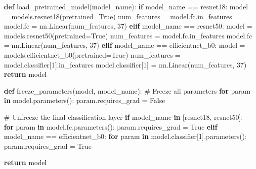 \documentclass[
]{article}
\newenvironment{Shaded}{\begin{snugshade}}{\end{snugshade}}
\newcommand{\CommentTok}[1]{\textcolor[rgb]{0.37,0.37,0.37}{#1}}
\newcommand{\ControlFlowTok}[1]{\textcolor[rgb]{0.00,0.23,0.31}{\textbf{#1}}}
\newcommand{\DecValTok}[1]{\textcolor[rgb]{0.68,0.00,0.00}{#1}}
\newcommand{\KeywordTok}[1]{\textcolor[rgb]{0.00,0.23,0.31}{\textbf{#1}}}
\newcommand{\NormalTok}[1]{\textcolor[rgb]{0.00,0.23,0.31}{#1}}
\newcommand{\OperatorTok}[1]{\textcolor[rgb]{0.37,0.37,0.37}{#1}}
\newcommand{\StringTok}[1]{\textcolor[rgb]{0.13,0.47,0.30}{#1}}
\newcommand{\VariableTok}[1]{\textcolor[rgb]{0.07,0.07,0.07}{#1}}
\begin{document}
\begin{Shaded}
\begin{Highlighting}[]
\KeywordTok{def}\NormalTok{ load\_pretrained\_model(model\_name):}
    \ControlFlowTok{if}\NormalTok{ model\_name }\OperatorTok{==} \StringTok{\textquotesingle{}resnet18\textquotesingle{}}\NormalTok{:}
\NormalTok{        model }\OperatorTok{=}\NormalTok{ models.resnet18(pretrained}\OperatorTok{=}\VariableTok{True}\NormalTok{)}
\NormalTok{        num\_features }\OperatorTok{=}\NormalTok{ model.fc.in\_features}
\NormalTok{        model.fc }\OperatorTok{=}\NormalTok{ nn.Linear(num\_features, }\DecValTok{37}\NormalTok{)}
    \ControlFlowTok{elif}\NormalTok{ model\_name }\OperatorTok{==} \StringTok{\textquotesingle{}resnet50\textquotesingle{}}\NormalTok{:}
\NormalTok{        model }\OperatorTok{=}\NormalTok{ models.resnet50(pretrained}\OperatorTok{=}\VariableTok{True}\NormalTok{)}
\NormalTok{        num\_features }\OperatorTok{=}\NormalTok{ model.fc.in\_features}
\NormalTok{        model.fc }\OperatorTok{=}\NormalTok{ nn.Linear(num\_features, }\DecValTok{37}\NormalTok{)}
    \ControlFlowTok{elif}\NormalTok{ model\_name }\OperatorTok{==} \StringTok{\textquotesingle{}efficientnet\_b0\textquotesingle{}}\NormalTok{:}
\NormalTok{        model }\OperatorTok{=}\NormalTok{ models.efficientnet\_b0(pretrained}\OperatorTok{=}\VariableTok{True}\NormalTok{)}
\NormalTok{        num\_features }\OperatorTok{=}\NormalTok{ model.classifier[}\DecValTok{1}\NormalTok{].in\_features}
\NormalTok{        model.classifier[}\DecValTok{1}\NormalTok{] }\OperatorTok{=}\NormalTok{ nn.Linear(num\_features, }\DecValTok{37}\NormalTok{)}
    \ControlFlowTok{return}\NormalTok{ model}

\KeywordTok{def}\NormalTok{ freeze\_parameters(model, model\_name):}
    \CommentTok{\# Freeze all parameters}
    \ControlFlowTok{for}\NormalTok{ param }\KeywordTok{in}\NormalTok{ model.parameters():}
\NormalTok{        param.requires\_grad }\OperatorTok{=} \VariableTok{False}
    
    \CommentTok{\# Unfreeze the final classification layer}
    \ControlFlowTok{if}\NormalTok{ model\_name }\KeywordTok{in}\NormalTok{ [}\StringTok{\textquotesingle{}resnet18\textquotesingle{}}\NormalTok{, }\StringTok{\textquotesingle{}resnet50\textquotesingle{}}\NormalTok{]:}
        \ControlFlowTok{for}\NormalTok{ param }\KeywordTok{in}\NormalTok{ model.fc.parameters():}
\NormalTok{            param.requires\_grad }\OperatorTok{=} \VariableTok{True}
    \ControlFlowTok{elif}\NormalTok{ model\_name }\OperatorTok{==} \StringTok{\textquotesingle{}efficientnet\_b0\textquotesingle{}}\NormalTok{:}
        \ControlFlowTok{for}\NormalTok{ param }\KeywordTok{in}\NormalTok{ model.classifier[}\DecValTok{1}\NormalTok{].parameters():}
\NormalTok{            param.requires\_grad }\OperatorTok{=} \VariableTok{True}
    
    \ControlFlowTok{return}\NormalTok{ model}
\end{Highlighting}
\end{Shaded}
\end{document}
